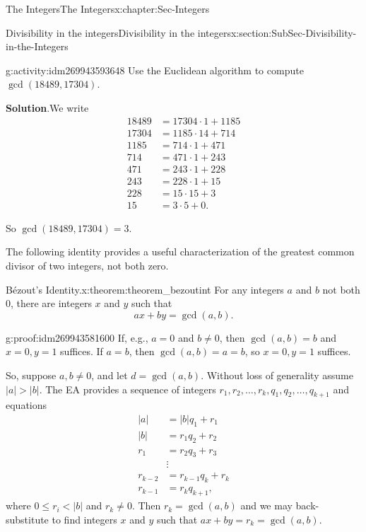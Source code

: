 \documentclass[oneside,10pt,]{book}
\numberwithin{equation}{section}
\renewcommand{\le}{\leqslant}
\newcommand{\lt}{<}
\newcommand{\amp}{&}
\begin{document}
\begin{chapterptx}{The Integers}{}{The Integers}{}{}{x:chapter:Sec-Integers}
\begin{sectionptx}{Divisibility in the integers}{}{Divisibility in the integers}{}{}{x:section:SubSec-Divisibility-in-the-Integers}
\begin{activity}{}{g:activity:idm269943593648}
Use the Euclidean algorithm to compute \(\gcd(18489,17304)\).%
\par\smallskip%
\noindent\textbf{Solution}.\hypertarget{g:solution:idm269943592064}{}\quad{}We write%
\begin{align*}
18489 \amp = 17304 \cdot 1 +1185\\
17304 \amp = 1185\cdot 14 +714\\
1185 \amp = 714 \cdot 1 + 471\\
714 \amp = 471 \cdot 1+ 243\\
471 \amp = 243\cdot 1 + 228\\
243 \amp = 228 \cdot 1+ 15\\
228 \amp = 15 \cdot 15 + 3\\
15 \amp = 3\cdot 5 + 0\text{.}
\end{align*}
%
\par
So \(\gcd(18489,17304)=3\).%
\end{activity}
The following identity provides a useful characterization of the greatest common divisor of two integers, not both zero.%
\begin{theorem}{Bézout's Identity.}{}{x:theorem:theorem_bezoutint}%
For any integers \(a\) and \(b\) not both 0, there are integers \(x\) and \(y\) such that%
\begin{equation*}
ax + by = \gcd(a,b)\text{.}
\end{equation*}
%
\end{theorem}
\begin{proofptx}{}{g:proof:idm269943581600}
If, e.g., \(a = 0\) and \(b\ne 0\), then \(\gcd(a,b) = b\) and \(x=0,y=1\) suffices. If \(a = b\), then \(\gcd(a,b) = a = b\), so \(x = 0, y = 1\) suffices.%
\par
So, suppose \(a,b\ne 0\), and let \(d = \gcd(a,b)\). Without loss of generality assume \(|a| > |b|\). The EA provides a sequence of integers \(r_1, r_2, \ldots,
r_k, q_1, q_2, \ldots, q_{k+1}\) and equations%
\begin{align*}
|a| \amp = |b| q_1 + r_1\\
|b| \amp = r_1 q_2 + r_2\\
r_1 \amp = r_2 q_3 + r_3\\
\amp \vdots\\
r_{k-2} \amp = r_{k-1} q_k + r_k\\
r_{k-1} \amp = r_k q_{k+1}\text{,}
\end{align*}
where \(0\le r_i \lt  |b|\) and \(r_k \ne 0\). Then \(r_k = \gcd(a,b)\) and we may back-substitute to find integers \(x\) and \(y\) such that \(ax + by = r_k = \gcd(a,b)\).%

\end{proofptx}
\end{sectionptx}
\end{chapterptx}
\end{document}
